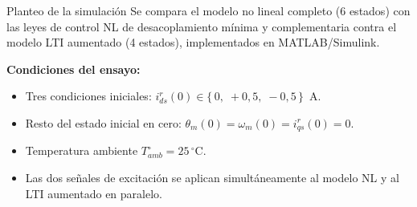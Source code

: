 \documentclass[aspectratio=169,t]{beamer}
\begin{document}
\begin{frame}{Planteo de la simulación}
{\small\color{uncGray}Se compara el modelo no lineal completo (6 estados) con las leyes de control NL de desacoplamiento mínima y complementaria contra el modelo LTI aumentado (4 estados), implementados en MATLAB/Simulink.}\par
\vspace{4mm}

\textbf{Condiciones del ensayo:}
\begin{itemize}
\item Tres condiciones iniciales: $i_{ds}^{r}(0) \in \{\,0,\;+0{,}5,\;-0{,}5\,\}$~A.
\item Resto del estado inicial en cero: $\theta_m(0) = \omega_m(0) = i_{qs}^{r}(0) = 0$.
\item Temperatura ambiente $T_{amb}^\circ = 25\,^\circ$C.
\item Las dos señales de excitación se aplican simultáneamente al modelo NL y al LTI aumentado en paralelo.
\end{itemize}
\end{frame}
\end{document}
